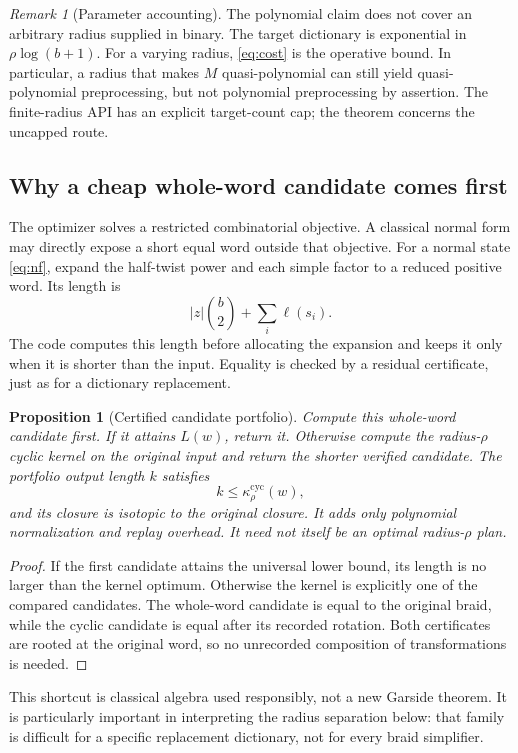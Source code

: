 \documentclass[11pt,a4paper]{article}
\newtheorem{proposition}[theorem]{Proposition}
\theoremstyle{definition}\newtheorem{definition}[theorem]{Definition}
\theoremstyle{remark}\newtheorem{remark}[theorem]{Remark}
\newcommand{\kc}[1]{\kappa^{\mathrm{cyc}}_{#1}}
\begin{document}
\begin{remark}[Parameter accounting]
The polynomial claim does not cover an arbitrary radius supplied in binary.
The target dictionary is exponential in $\rho\log(b+1)$. For a varying
radius, \eqref{eq:cost} is the operative bound. In particular, a radius that
makes $M$ quasi-polynomial can still yield quasi-polynomial preprocessing,
but not polynomial preprocessing by assertion. The finite-radius API has
an explicit target-count cap; the theorem concerns the uncapped route.
\end{remark}

\subsection{Why a cheap whole-word candidate comes first}
The optimizer solves a restricted combinatorial objective. A classical
normal form may directly expose a short equal word outside that objective.
For a normal state \eqref{eq:nf}, expand the half-twist power and each simple
factor to a reduced positive word. Its length is
\[
 |z|\binom b2+\sum_i\ell(s_i).
\]
The code computes this length before allocating the expansion and keeps it
only when it is shorter than the input. Equality is checked by a residual
certificate, just as for a dictionary replacement.

\begin{proposition}[Certified candidate portfolio]\label{prop:portfolio}
Compute this whole-word candidate first. If it attains $L(w)$, return it.
Otherwise compute the radius-$\rho$ cyclic kernel on the \emph{original}
input and return the shorter verified candidate. The portfolio output
length $k$ satisfies
\[
 k\le\kc{\rho}(w),
\]
and its closure is isotopic to the original closure. It adds only polynomial
normalization and replay overhead. It need not itself be an optimal
radius-$\rho$ plan.
\end{proposition}
\begin{proof}
If the first candidate attains the universal lower bound, its length is
no larger than the kernel optimum. Otherwise the kernel is explicitly one
of the compared candidates. The whole-word candidate is equal to the
original braid, while the cyclic candidate is equal after its recorded
rotation. Both certificates are rooted at the original word, so no
unrecorded composition of transformations is needed.
\end{proof}

This shortcut is classical algebra used responsibly, not a new Garside
theorem. It is particularly important in interpreting the radius separation
below: that family is difficult for a specific replacement dictionary,
not for every braid simplifier.
\end{document}
